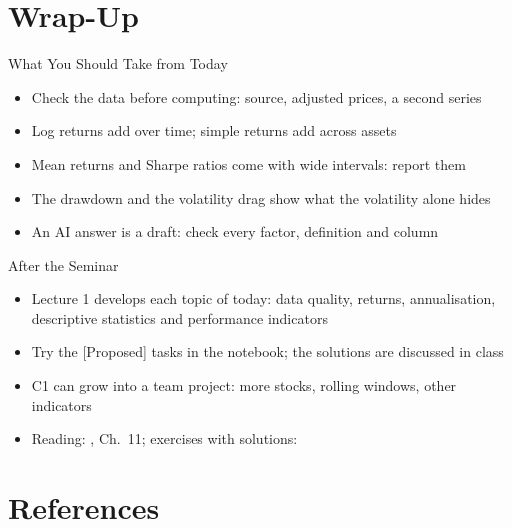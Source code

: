 \section{Wrap-Up}

\begin{frame}{What You Should Take from Today}
\itemsize{\small}
\begin{itemize}
    \item Check the data before computing: source, adjusted prices, a second series
    \item Log returns add over time; simple returns add across assets
    \item Mean returns and Sharpe ratios come with wide intervals: report them
    \item The drawdown and the volatility drag show what the volatility alone hides
    \item An AI answer is a draft: check every factor, definition and column
\end{itemize}
\end{frame}

\begin{frame}{After the Seminar}
\itemsize{\small}
\begin{itemize}
    \item Lecture 1 develops each topic of today: data quality, returns, annualisation, descriptive statistics and performance indicators
    \item Try the [Proposed] tasks in the notebook; the solutions are discussed in class
    \item C1 can grow into a team project: more stocks, rolling windows, other indicators
    \item Reading: , Ch.~11; exercises with solutions: 
\end{itemize}
\end{frame}


\section{References}

